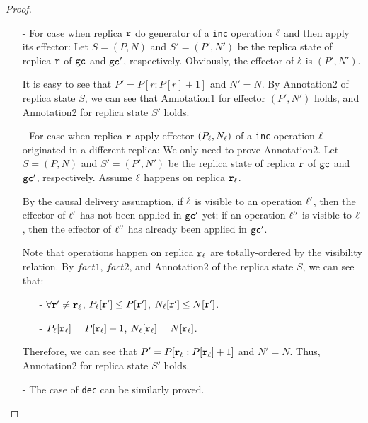 \begin {proof}
\begin{itemize}
    \begin{itemize}
    \setlength{\itemsep}{0.5pt}
    \item[-] For case when replica $\mathtt{r}$ do generator of a {\tt inc} operation $\ell$ and then apply its effector: Let $S=(P,N)$ and $S'=(P',N')$ be the replica state of replica $\mathtt{r}$ of $\mathtt{gc}$ and $\mathtt{gc}'$, respectively. Obviously, the effector of $\ell$ is $(P',N')$.

        It is easy to see that $P'=P[r:P[r]+1]$ and $N'=N$. By Annotation2 of replica state $S$, we can see that Annotation1 for effector $(P',N')$ holds, and Annotation2 for replica state $S'$ holds.

    \item[-] For case when replica $\mathtt{r}$ apply effector $(P_{\ell},N_{\ell})$ of a {\tt inc} operation $\ell$ originated in a different replica: We only need to prove Annotation2. Let $S=(P,N)$ and $S'=(P',N')$ be the replica state of replica $\mathtt{r}$ of $\mathtt{gc}$ and $\mathtt{gc}'$, respectively. Assume $\ell$ happens on replica $\mathtt{r}_{\ell}$.

        By the causal delivery assumption, if $\ell$ is visible to an operation $\ell'$, then the effector of $\ell'$ has not been applied in $\mathtt{gc}'$ yet; if an operation $\ell''$ is visible to $\ell$, then the effector of $\ell''$ has already been applied in $\mathtt{gc}'$.

        Note that operations happen on replica $\mathtt{r}_{\ell}$ are totally-ordered by the visibility relation. By $fact1$, $fact2$, and Annotation2 of the replica state $S$, we can see that:

        \begin{itemize}
        \setlength{\itemsep}{0.5pt}
        \item[-] $\forall \mathtt{r}' \neq \mathtt{r}_{\ell}$, $P_{\ell}[\mathtt{r}'] \leq P[\mathtt{r}']$, $N_{\ell}[\mathtt{r}'] \leq N[\mathtt{r}']$.

        \item[-] $P_{\ell}[\mathtt{r}_{\ell}] = P[\mathtt{r}_{\ell}]+1$, $N_{\ell}[\mathtt{r}_{\ell}] = N[\mathtt{r}_{\ell}]$.
        \end{itemize}

        Therefore, we can see that $P' = P[\mathtt{r}_{\ell}: P[\mathtt{r}_{\ell}]+1]$ and $N' = N$. Thus, Annotation2 for replica state $S'$ holds.

    \item[-] The case of {\tt dec} can be similarly proved.
    \end{itemize}


\end{itemize}
\end{proof}
